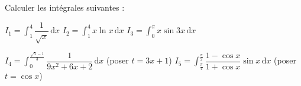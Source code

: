 
\begin{exercice}\label{exoautoanalyseCTU-48}

Calculer les intégrales suivantes :

\medskip
$I_{1}=\displaystyle\int_{1}^{4}\dfrac{1}{\sqrt{x}} \,\mathrm dx$ \hspace{2 cm} $I_{2}=\displaystyle\int_{1}^{4}x\ln x \,\mathrm dx$ \hspace{2 cm}$I_{3}=\displaystyle\int_{0}^{\pi}x\sin 3x \,\mathrm dx$ 

$I_{4}=\displaystyle\int_{0}^{{\frac{\sqrt{3}-1}{3}}}\dfrac{1}{9x^2+6x+2} \,\mathrm dx$ \quad (poser $t= 3x+1$)\hfill
$I_{5}=\displaystyle\int_{\frac{\pi}{4}}^{{\frac{\pi}{2}}}\dfrac{1-\cos x}{1+\cos x}\sin x  \,\mathrm dx$ \quad (poser $t= \cos x$)


\end{exercice}

